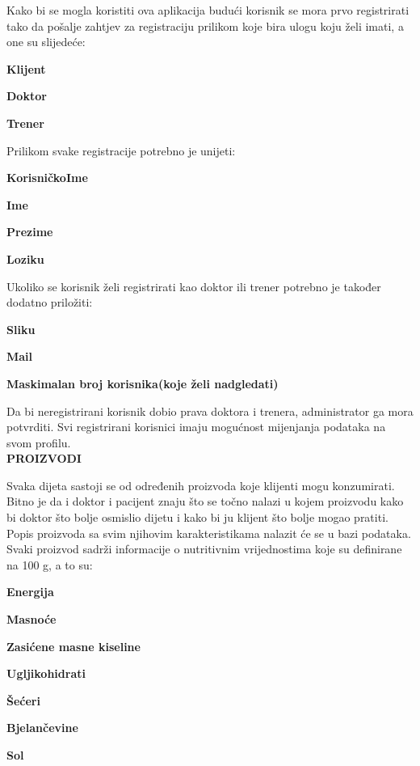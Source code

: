 		Kako bi se mogla koristiti ova aplikacija budući korisnik se mora prvo registrirati tako da pošalje zahtjev za registraciju prilikom koje bira ulogu koju želi imati, a one su slijedeće:
		\begin{packed_item}
		\item \textbf{Klijent}
		\item \textbf{Doktor}
		\item \textbf{Trener}
		\end{packed_item}
		Prilikom svake registracije potrebno je unijeti:
		\begin{packed_item}
		\item \textbf{KorisničkoIme}
		\item \textbf{Ime}
		\item \textbf{Prezime}	
		\item \textbf{Loziku}
		\end{packed_item}
		Ukoliko se korisnik želi registrirati kao doktor ili trener potrebno je također dodatno priložiti:
		
		\begin{packed_item}
		\item \textbf{Sliku}
		\item \textbf{Mail}
		\item \textbf{Maskimalan broj korisnika(koje želi nadgledati)}	
		\end{packed_item}
	
		Da bi neregistrirani korisnik dobio prava doktora i trenera, administrator ga mora potvrditi.
		Svi registrirani korisnici imaju mogućnost mijenjanja podataka na svom profilu.\\
		
		\noindent \textbf{PROIZVODI}
		
		Svaka dijeta sastoji se od određenih proizvoda koje klijenti mogu konzumirati. Bitno je da i doktor i pacijent znaju što se točno nalazi u kojem proizvodu kako bi doktor što bolje osmislio dijetu i kako bi ju klijent  što bolje mogao pratiti.
		Popis proizvoda sa svim njihovim karakteristikama nalazit će se u bazi podataka. Svaki proizvod sadrži informacije o nutritivnim vrijednostima koje su definirane na 100 g, a to su:
		
			\begin{packed_item}
			\item \textbf{Energija}
			\item \textbf{Masnoće}
			\item \textbf{Zasićene masne kiseline}	
			\item \textbf{Ugljikohidrati}
			\item \textbf{Šećeri}
			\item \textbf{Bjelančevine}
			\item \textbf{Sol}
		\end{packed_item}
	
